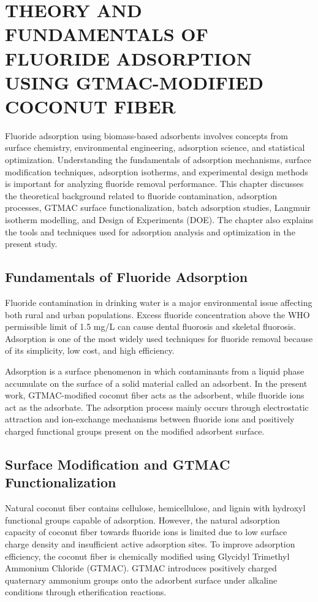 \chapter{THEORY AND FUNDAMENTALS OF FLUORIDE ADSORPTION 
	USING GTMAC-MODIFIED COCONUT FIBER }

Fluoride adsorption using biomass-based adsorbents involves concepts from surface chemistry, environmental engineering, adsorption science, and statistical optimization. Understanding the fundamentals of adsorption mechanisms, surface modification techniques, adsorption isotherms, and experimental design methods is important for analyzing fluoride removal performance. This chapter discusses the theoretical background related to fluoride contamination, adsorption processes, GTMAC surface functionalization, batch adsorption studies, Langmuir isotherm modelling, and Design of Experiments (DOE). The chapter also explains the tools and techniques used for adsorption analysis and optimization in the present study. 

\section{Fundamentals of Fluoride Adsorption}

Fluoride contamination in drinking water is a major environmental issue affecting both rural and urban populations. Excess fluoride concentration above the WHO permissible limit of 1.5 mg/L can cause dental fluorosis and skeletal fluorosis. Adsorption is one of the most widely used techniques for fluoride removal because of its simplicity, low cost, and high efficiency. 

Adsorption is a surface phenomenon in which contaminants from a liquid phase accumulate on the surface of a solid material called an adsorbent. In the present work, GTMAC-modified coconut fiber acts as the adsorbent, while fluoride ions act as the adsorbate. The adsorption process mainly occurs through electrostatic attraction and ion-exchange mechanisms between fluoride ions and positively charged functional groups present on the modified adsorbent surface. 

\section{Surface Modification and GTMAC Functionalization}
Natural coconut fiber contains cellulose, hemicellulose, and lignin with hydroxyl functional groups capable of adsorption. However, the natural adsorption capacity of coconut fiber towards fluoride ions is limited due to low surface charge density and insufficient active adsorption sites. To improve adsorption efficiency, the coconut fiber is chemically modified using Glycidyl Trimethyl Ammonium Chloride (GTMAC). GTMAC introduces positively charged quaternary ammonium groups onto the adsorbent surface under alkaline conditions through etherification reactions. 

